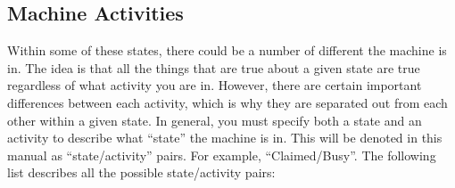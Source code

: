\subsection{Machine Activities}
\label{sec:Activities}

Within some of these states, there could be a number of different
 the machine is in.  The idea is that all the things
that are true about a given state are true regardless of what activity
you are in.  However, there are certain important differences between
each activity, which is why they are separated out from each other
within a given state.  In general, you must specify both a state and
an activity to describe what ``state'' the machine is in.  This will be
denoted in this manual as ``state/activity'' pairs.  For example,
``Claimed/Busy''.  The following list describes all the possible
state/activity pairs:

